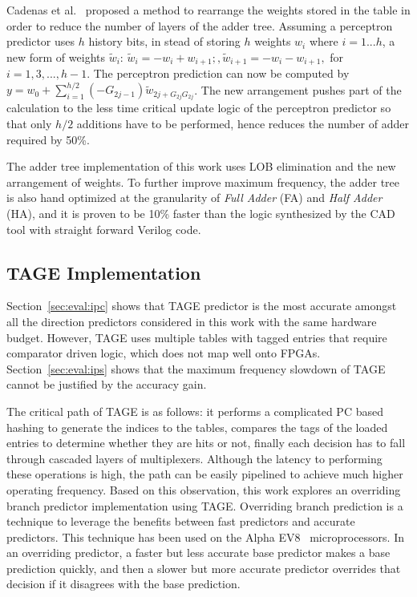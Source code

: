 \documentclass[conference]{IEEEtran}
\begin{document}
Cadenas et al.~\cite{perceptronRearrange} proposed a method to rearrange the weights stored in the table in order to reduce the number of layers of the adder tree. Assuming a perceptron predictor uses $h$ history bits, in stead of storing $h$ weights $w_i$ where $i = 1 ... h$, a new form of weights $\widetilde{w}_i$: $\widetilde{w}_i = - w_i + w_{i+1};, \widetilde{w}_{i+1} = - w_i - w_{i+1},$ for $i = 1, 3, ..., h-1$. The perceptron prediction can now be computed by $y = w_0 + \sum_{i=1}^{h/2}(-G_{2j-1})\widetilde{w}_{2j+G_{2j}G_{2j}}$. The new arrangement pushes part of the calculation to the less time critical update logic of the perceptron predictor so that only $h/2$ additions have to be performed, hence reduces the number of adder required by 50\%.

The adder tree implementation of this work uses LOB elimination and the new arrangement of weights. To further improve maximum frequency, the adder tree is also hand optimized at the granularity of \textit{Full Adder} (FA) and \textit{Half Adder} (HA), and it is proven to be 10\% faster than the logic synthesized by the CAD tool with straight forward Verilog code.


\subsection{TAGE Implementation}
\label{sec:fpga:tage}
Section~\ref{sec:eval:ipc} shows that TAGE predictor is the most accurate amongst all the direction predictors considered in this work with the same hardware budget. However, TAGE uses multiple tables with tagged entries that require comparator driven logic, which does not map well onto FPGAs. Section~\ref{sec:eval:ips} shows that the maximum frequency slowdown of TAGE cannot be justified by the accuracy gain.

The critical path of TAGE is as follows: it performs a complicated PC based hashing to generate the indices to the tables, compares the tags of the loaded entries to determine whether they are hits or not, finally each decision has to fall through cascaded layers of multiplexers. Although the latency to performing these operations is high, the path can be easily pipelined to achieve much higher operating frequency. Based on this observation, this work explores an overriding branch predictor implementation using TAGE. Overriding branch prediction is a technique to leverage the benefits between fast predictors and accurate predictors. This technique has been used on the Alpha EV8~\cite{alphaEV8} microprocessors. In an overriding predictor, a faster but less accurate base predictor makes a base prediction quickly, and then a slower but more accurate predictor overrides that decision if it disagrees with the base prediction. 
\end{document}
